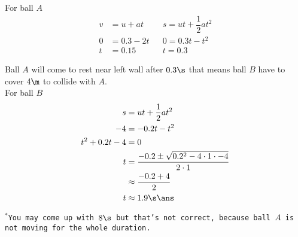 \documentclass{article}
\begin{document}
For ball $A$ 
\begin{align*}
v &= u + at && s=ut +\dfrac{1}{2}at^2\\
0 &= 0.3 - 2t && 0=0.3t -t^2\\
t &= 0.15 && t = 0.3
\end{align*}

Ball $A$ will come to rest near left wall after $0.3\s$ that means ball $B$ have to cover $4\m$ to collide with $A$.\\

For ball $B$
\begin{align*}
s &= ut +\dfrac{1}{2}at^2\\
-4 &=-0.2t -t^2\\
t^2 +0.2t -4 &=0\\
t &= \dfrac{-0.2\pm \sqrt{0.2^2-4\cdot 1 \cdot -4}}{2\cdot 1}\\
  &\approx \dfrac{-0.2+4}{2}\\
  t &\approx 1.9\s \ans
\end{align*} 
\vspace*{\fill}

\texttt{$^*$You may come up with $8\s$ but that's not correct, because ball $A$ is not moving for the whole duration. }

\vspace*{\fill}
\pagebreak
\vspace*{\fill}
\begin{center}
\end{center}

\vspace*{\fill}

\pagebreak
\vspace*{\fill}
\begin{center}
\end{center}

\vspace*{\fill}

\pagebreak
\vspace*{\fill}
\begin{center}
	\fbox{\qrcode[height=2cm]{\gdrive}}
\end{center}
\vspace*{\fill}
\end{document}
